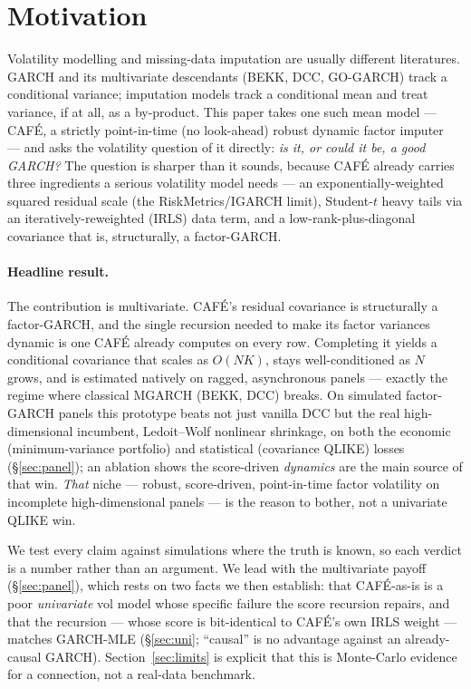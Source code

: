\documentclass[10pt,twocolumn]{article}
\newcommand{\cafe}{CAF\'E}
\begin{document}
\section{Motivation}\label{sec:intro}
Volatility modelling and missing-data imputation are usually different literatures.
GARCH and its multivariate descendants (BEKK, DCC, GO-GARCH) track a conditional
variance; imputation models track a conditional mean and treat variance, if at all,
as a by-product. This paper takes one such mean model --- \cafe{}, a strictly
point-in-time (no look-ahead) robust dynamic factor imputer~\cite{snow2025cafe} ---
and asks the volatility question of it directly: \emph{is it, or could it be, a good
GARCH?} The question is sharper than it sounds, because \cafe{} already carries three
ingredients a serious volatility model needs --- an exponentially-weighted squared
residual scale (the RiskMetrics/IGARCH limit), Student-$t$ heavy tails via an
iteratively-reweighted (IRLS) data term, and a low-rank-plus-diagonal covariance that
is, structurally, a factor-GARCH.

\paragraph{Headline result.} The contribution is multivariate. \cafe{}'s residual
covariance is structurally a factor-GARCH, and the single recursion needed to make its
factor variances dynamic is one \cafe{} already computes on every row. Completing it
yields a conditional covariance that scales as $O(NK)$, stays well-conditioned as $N$
grows, and is estimated natively on ragged, asynchronous panels --- exactly the regime
where classical MGARCH (BEKK, DCC) breaks. On simulated factor-GARCH panels this
prototype beats not just vanilla DCC but the real high-dimensional incumbent, Ledoit--Wolf
nonlinear shrinkage, on both the economic (minimum-variance portfolio) and statistical
(covariance QLIKE) losses (\S\ref{sec:panel}); an ablation shows the score-driven
\emph{dynamics} are the main source of that win. \emph{That} niche --- robust,
score-driven, point-in-time factor volatility on incomplete high-dimensional panels --- is
the reason to bother, not a univariate QLIKE win.

We test every claim against simulations where the truth is known, so each verdict is a
number rather than an argument. We lead with the multivariate payoff (\S\ref{sec:panel}),
which rests on two facts we then establish: that \cafe{}-as-is is a poor \emph{univariate}
vol model whose specific failure the score recursion repairs, and that the recursion ---
whose score is bit-identical to \cafe{}'s own IRLS weight --- matches GARCH-MLE
(\S\ref{sec:uni}; ``causal'' is no advantage against an already-causal GARCH).
Section~\ref{sec:limits} is explicit that this is Monte-Carlo evidence for a connection,
not a real-data benchmark.
\end{document}
